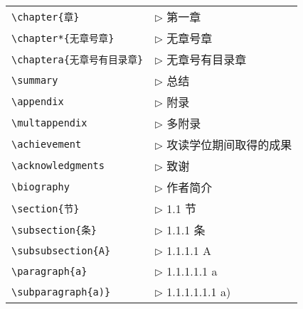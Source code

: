 \begin{tabular}{ll}
  \verb|\chapter{章}| & $\triangleright$ 第一章                 \\
  \verb|\chapter*{无章号章}| & $\triangleright$ 无章号章               \\
  \verb|\chaptera{无章号有目录章}| & $\triangleright$ 无章号有目录章         \\
  \verb|\summary| & $\triangleright$ 总结                   \\
  \verb|\appendix| & $\triangleright$ 附录                   \\
  \verb|\multappendix| & $\triangleright$ 多附录                 \\
  \verb|\achievement| & $\triangleright$ 攻读学位期间取得的成果 \\
  \verb|\acknowledgments| & $\triangleright$ 致谢                   \\
  \verb|\biography| & $\triangleright$ 作者简介               \\
  \verb|\section{节}| & $\triangleright$ 1.1 节                 \\
  \verb|\subsection{条}| & $\triangleright$ 1.1.1 条               \\
  \verb|\subsubsection{A}| & $\triangleright$ 1.1.1.1 A              \\
  \verb|\paragraph{a}| & $\triangleright$ 1.1.1.1.1 a            \\
  \verb|\subparagraph{a)}| & $\triangleright$ 1.1.1.1.1.1 a)         \\
\end{tabular}

